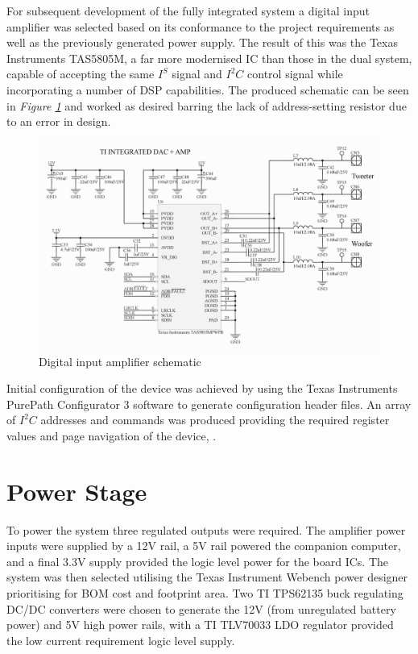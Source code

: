 \documentclass[main.tex]{subfiles}
\begin{document}
For subsequent development of the fully integrated system a digital input amplifier was selected based on its conformance to the project requirements as well as the previously generated power supply. The result of this was the Texas Instruments TAS5805M, a far more modernised IC than those in the dual system, capable of accepting the same $I^S$ signal and $I^2C$ control signal while incorporating a number of DSP capabilities. The produced schematic can be seen in \textit{Figure \ref{fig:tas-circuit}} and worked as desired barring the lack of address-setting resistor due to an error in design.

\begin{figure}[H]
    \centering
    \includegraphics[scale=0.75]{./figs/TAS-circuit.PNG}
    \caption{Digital input amplifier schematic}
    \label{fig:tas-circuit}
\end{figure}

Initial configuration of the device was achieved by using the Texas Instruments PurePath Configurator 3 software to generate configuration header files. An array of $I^2C$ addresses and commands was produced providing the required register values and page navigation of the device, .

\section{Power Stage}

To power the system three regulated outputs were required. The amplifier power inputs were supplied by a 12V rail, a 5V rail powered the companion computer, and a final 3.3V supply provided the logic level power for the board ICs. The system was then selected utilising the Texas Instrument Webench power designer prioritising for BOM cost and footprint area. Two TI TPS62135 buck regulating DC/DC converters were chosen to generate the 12V (from unregulated battery power) and 5V high power rails, with a TI TLV70033 LDO regulator provided the low current requirement logic level supply. 
\end{document}
